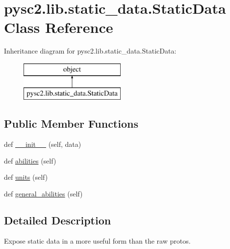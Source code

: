 \hypertarget{classpysc2_1_1lib_1_1static__data_1_1_static_data}{}\section{pysc2.\+lib.\+static\+\_\+data.\+Static\+Data Class Reference}
\label{classpysc2_1_1lib_1_1static__data_1_1_static_data}
Inheritance diagram for pysc2.\+lib.\+static\+\_\+data.\+Static\+Data\+:\begin{figure}[H]
\begin{center}
\leavevmode
\includegraphics[height=2.000000cm]{classpysc2_1_1lib_1_1static__data_1_1_static_data}
\end{center}
\end{figure}
\subsection*{Public Member Functions}
\begin{DoxyCompactItemize}
\item 
def \mbox{\hyperlink{classpysc2_1_1lib_1_1static__data_1_1_static_data_a74d9bde243396eb9e5a77214b084906c}{\+\_\+\+\_\+init\+\_\+\+\_\+}} (self, data)
\item 
def \mbox{\hyperlink{classpysc2_1_1lib_1_1static__data_1_1_static_data_ac7d6c11371cf3d5cc131657cdbaa8bbc}{abilities}} (self)
\item 
def \mbox{\hyperlink{classpysc2_1_1lib_1_1static__data_1_1_static_data_ad73c4df07a81420cc5412531d99a3652}{units}} (self)
\item 
def \mbox{\hyperlink{classpysc2_1_1lib_1_1static__data_1_1_static_data_a38efb3d17d6da0a579e40568097db20c}{general\+\_\+abilities}} (self)
\end{DoxyCompactItemize}


\subsection{Detailed Description}
\begin{DoxyVerb}Expose static data in a more useful form than the raw protos.\end{DoxyVerb}
 

